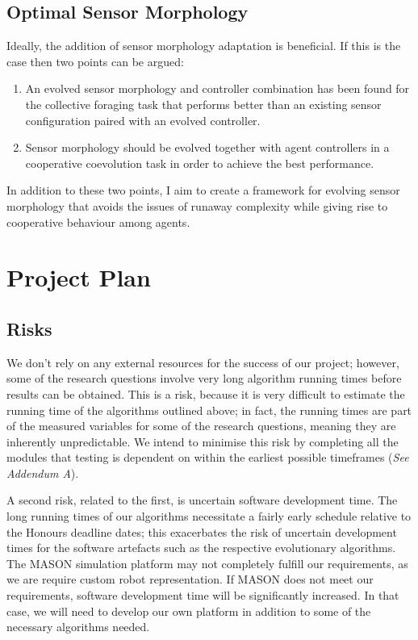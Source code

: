 \documentclass[a4paper,12pt]{article}
\begin{document}
\subsection{Optimal Sensor Morphology}
Ideally, the addition of sensor morphology adaptation is beneficial. If this is the case then two points can be argued:
\begin{enumerate}
\item An evolved sensor morphology and controller combination has been found for the collective foraging task that performs better than an existing sensor configuration paired with an evolved controller.
\item Sensor morphology should be evolved together with agent controllers in a cooperative coevolution task in order to achieve the best performance.
\end{enumerate}

In addition to these two points, I aim to create a framework for evolving sensor morphology that avoids the issues of runaway complexity while giving rise to cooperative behaviour among agents.

\section{Project Plan}

\subsection{Risks}
We don’t rely on any external resources for the success of our project; however, some of the research questions involve very long algorithm running times before results can be obtained. This is a risk, because it is very difficult to estimate the running time of the algorithms outlined above; in fact, the running times are part of the measured variables for some of the research questions, meaning they are inherently unpredictable. We intend to minimise this risk by completing all the modules that testing is dependent on within the earliest possible timeframes (\textit{See Addendum A}).

A second risk, related to the first, is uncertain software development time. The long running times of our algorithms necessitate a fairly early schedule relative to the Honours deadline dates; this exacerbates the risk of uncertain development times for the software artefacts such as the respective evolutionary algorithms. The MASON simulation platform may not completely fulfill our requirements, as we are require custom robot representation. If MASON does not meet our requirements, software development time will be significantly increased. In that case, we will need to develop our own platform in addition to some of the necessary algorithms needed.
\end{document}
